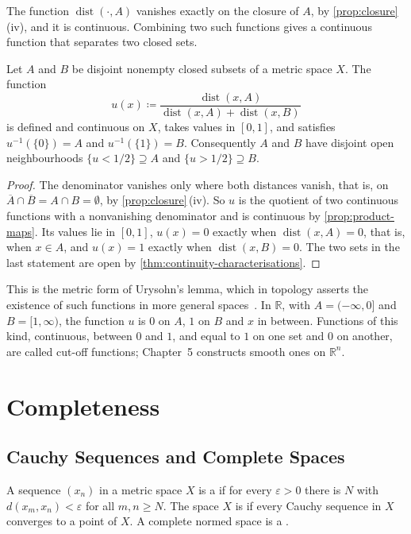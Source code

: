 The function $\operatorname{dist}(\cdot,A)$ vanishes exactly on the closure of $A$, by \cref{prop:closure}\,(iv), and it is continuous. Combining two such functions gives a continuous function that separates two closed sets.

\begin{lemma}
\label{lem:urysohn}
Let $A$ and $B$ be disjoint nonempty closed subsets of a metric space $X$. The function
\[
u(x)\coloneqq\frac{\operatorname{dist}(x,A)}{\operatorname{dist}(x,A)+\operatorname{dist}(x,B)}
\]
is defined and continuous on $X$, takes values in $[0,1]$, and satisfies $u^{-1}(\{0\})=A$ and $u^{-1}(\{1\})=B$. Consequently $A$ and $B$ have disjoint open neighbourhoods $\{u<1/2\}\supseteq A$ and $\{u>1/2\}\supseteq B$.
\end{lemma}

\begin{proof}
The denominator vanishes only where both distances vanish, that is, on $\overline A\cap\overline B=A\cap B=\emptyset$, by \cref{prop:closure}\,(iv). So $u$ is the quotient of two continuous functions with a nonvanishing denominator and is continuous by \cref{prop:product-maps}. Its values lie in $[0,1]$, $u(x)=0$ exactly when $\operatorname{dist}(x,A)=0$, that is, when $x\in A$, and $u(x)=1$ exactly when $\operatorname{dist}(x,B)=0$. The two sets in the last statement are open by \cref{thm:continuity-characterisations}.
\end{proof}

This is the metric form of Urysohn's lemma, which in topology asserts the existence of such functions in more general spaces~\cite[Chap.~4]{folland1999}. In $\mathbb R$, with $A=(-\infty,0]$ and $B=[1,\infty)$, the function $u$ is $0$ on $A$, $1$ on $B$ and $x$ in between. Functions of this kind, continuous, between $0$ and $1$, and equal to $1$ on one set and $0$ on another, are called cut-off functions; Chapter~5 constructs smooth ones on $\mathbb R^n$.

\section{Completeness}
\label{sec:completeness-metric}

\subsection{Cauchy Sequences and Complete Spaces}

\begin{definition}
\label{def:complete}
A sequence $(x_n)$ in a metric space $X$ is a  if for every $\varepsilon>0$ there is $N$ with $d(x_m,x_n)<\varepsilon$ for all $m,n\ge N$. The space $X$ is  if every Cauchy sequence in $X$ converges to a point of $X$. A complete normed space is a .
\end{definition}

